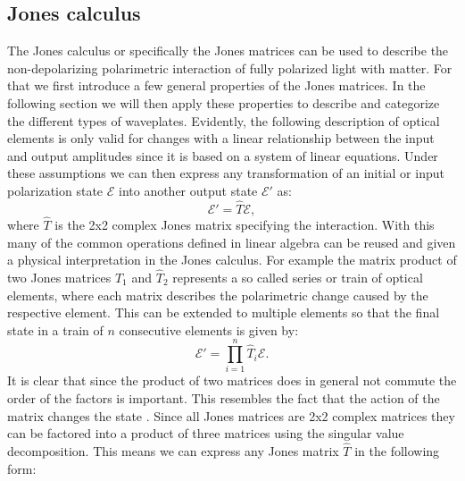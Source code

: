 
\subsection{Jones calculus}
\label{sec:jonescalc}
The Jones calculus or specifically the Jones matrices can be used to describe the non-depolarizing polarimetric interaction of fully polarized light with matter. For that we first introduce a few general properties of the Jones matrices. In the following section we will then apply these properties to describe and categorize the different types of waveplates. Evidently, the following description of optical elements is only valid for changes with a linear relationship between the input and output amplitudes since it is based on a system of linear equations. Under these assumptions we can then express any transformation of an initial or input polarization state $\bm{\mathcal{E}}$ into another output state $\bm{\mathcal{E}}'$ as:
\begin{equation}
    \bm{\mathcal{E}}' = \hat{T} \bm{\mathcal{E}},
\end{equation}
where $\hat{T}$ is the 2x2 complex Jones matrix specifying the interaction. With this many of the common operations defined in linear algebra can be reused and given a physical interpretation in the Jones calculus. For example the matrix product of two Jones matrices $\hat{T}_1$ and $\hat{T}_2$ represents a so called series or train of optical elements, where each matrix describes the polarimetric change caused by the respective element. This can be extended to multiple elements so that the final state in a train of $n$ consecutive elements is given by:
\begin{equation}
    \label{eq:jones_series_product}
    \bm{\mathcal{E}}' = \prod_{i=1}^{n} \hat{T}_i \bm{\mathcal{E}}.
\end{equation}
It is clear that since the product of two matrices does in general not commute the order of the factors is important. This resembles the fact that the action of the matrix changes the state \cite{Jones1941ACalculus}. Since all Jones matrices are 2x2 complex matrices they can be factored into a product of three matrices using the singular value decomposition. This means we can express any Jones matrix $\hat{T}$ in the following form:
